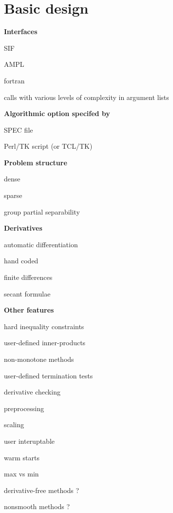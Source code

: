 \documentclass[twoside]{article}
\author{\paperauthor}
\title{\papertitle}
\newcommand{\alist}[2]{\begin{#1}{#2}\end{#1}}
\newcommand{\ilist}[1]{\alist{itemize}{#1}}
\newcommand{\header}[1]{\vspace{5mm}

\noindent
\textbf{\large {#1}}}
\begin{document}
\maketitle
\thispagestyle{empty}

\section{Basic design}

\header{Interfaces}

\ilist{
\item SIF
\item AMPL
\item fortran
\item calls with various levels of complexity in argument lists
}

\header{Algorithmic option specifed by}

\ilist{
\item SPEC file
\item Perl/TK script (or TCL/TK)
}

\header{Problem structure}

\ilist{
\item dense
\item sparse
\item group partial separability
}

\header{Derivatives}

\ilist{
\item automatic differentiation
\item hand coded
\item finite differences
\item secant formulae
}

\header{Other features}

\ilist{
\item hard inequality constraints
\item user-defined inner-products
\item non-monotone methods
\item user-defined termination tests
\item derivative checking
\item preprocessing
\item scaling
\item user interuptable
\item warm starts
\item max vs min
\item derivative-free methods ?
\item nonsmooth methods ?
}
\end{document}
